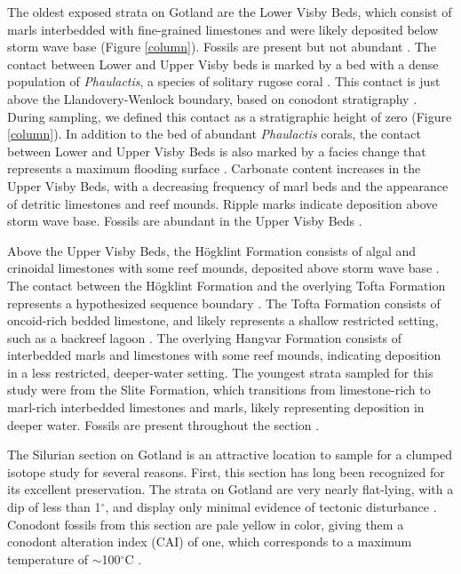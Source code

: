 \documentclass{article}
\newcommand{\degrees}{$^{\circ}$}
\begin{document}
The oldest exposed strata on Gotland are the Lower Visby Beds, which consist of marls interbedded with fine-grained limestones and were likely deposited below storm wave base (Figure \ref{column}). Fossils are present but not abundant \citep{Calner2004a,Samtleben1996}. The contact between Lower and Upper Visby beds is marked by a bed with a dense population of \textit{Phaulactis}, a species of solitary rugose coral \citep{Jeppsson1997,Jeppsson2006,Munnecke2003,Samtleben1996}. This contact is just above the Llandovery-Wenlock boundary, based on conodont stratigraphy \citep{Aldridge1993,Jeppsson1983,Mabillard1985}. During sampling, we defined this contact as a stratigraphic height of zero (Figure \ref{column}). In addition to the bed of abundant \textit{Phaulactis} corals, the contact between Lower and Upper Visby Beds is also marked by a facies change that represents a maximum flooding surface \citep{Calner2004b}. Carbonate content increases in the Upper Visby Beds, with a decreasing frequency of marl beds and the appearance of detritic limestones and reef mounds. Ripple marks indicate deposition above storm wave base. Fossils are abundant in the Upper Visby Beds \citep{Calner2004a,Samtleben1996}. 

Above the Upper Visby Beds, the H\"{o}gklint Formation consists of algal and crinoidal limestones with some reef mounds, deposited above storm wave base \citep{Riding1991,Samtleben1996,Watts2000}. The contact between the H\"{o}gklint Formation and the overlying Tofta Formation represents a hypothesized sequence boundary \citep{Calner2004b}. The Tofta Formation consists of oncoid-rich bedded limestone, and likely represents a shallow restricted setting, such as a backreef lagoon \citep{Riding1991,Samtleben1996}. The overlying Hangvar Formation consists of interbedded marls and limestones with some reef mounds, indicating deposition in a less restricted, deeper-water setting. The youngest strata sampled for this study were from the Slite Formation, which transitions from limestone-rich to marl-rich interbedded limestones and marls, likely representing deposition in deeper water. Fossils are present throughout the section \citep{Calner2004a}. 

The Silurian section on Gotland is an attractive location to sample for a clumped isotope study for several reasons. First, this section has long been recognized for its excellent preservation. The strata on Gotland are very nearly flat-lying, with a dip of less than 1\degrees, and display only minimal evidence of tectonic disturbance \citep{Calner2004a,Jeppsson1983}. Conodont fossils from this section are pale yellow in color, giving them a conodont alteration index (CAI) of one, which corresponds to a maximum temperature of $\sim$100\degrees C \citep{Epstein1976,Jeppsson1983,Wenzel2000}. 
\end{document}

